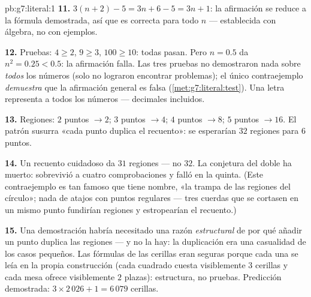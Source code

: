 \begin{solution}{pb:g7:literal:1}
\textbf{11.} $3(n + 2) - 5 = 3n + 6 - 5 = 3n + 1$: la afirmación
se reduce a la fórmula demostrada, así que es correcta para todo $n$ ---
establecida con álgebra, no con ejemplos.

\textbf{12.} Pruebas: $4 \geq 2$, $9 \geq 3$, $100 \geq 10$: todas
pasan. Pero $n = 0.5$ da $n^2 = 0.25 < 0.5$: la afirmación falla.
Las tres pruebas no demostraron nada sobre \emph{todos} los números (solo
no lograron encontrar problemas); el único contraejemplo
\emph{demuestra} que la afirmación general es falsa
(\cref{met:g7:literal:test}). Una letra representa a todos los números
--- decimales incluidos.

\textbf{13.} Regiones: $2$ puntos $\to 2$; $3$ puntos $\to 4$;
$4$ puntos $\to 8$; $5$ puntos $\to 16$. El patrón susurra
«cada punto duplica el recuento»: se esperarían $32$ regiones para
$6$ puntos.

\textbf{14.} Un recuento cuidadoso da $31$ regiones --- no $32$.
La conjetura del doble ha muerto: sobrevivió a cuatro comprobaciones y
falló en la quinta. (Este contraejemplo es tan famoso que tiene
nombre, «la trampa de las regiones del círculo»; nada de atajos con puntos regulares
--- tres cuerdas que se cortasen en un mismo punto fundirían regiones y
estropearían el recuento.)

\textbf{15.} Una demostración habría necesitado una razón \emph{estructural}
de por qué añadir un punto duplica las regiones --- y no la
hay: la duplicación era una casualidad de los casos pequeños. Las
fórmulas de las cerillas eran seguras porque cada una se leía en la
propia construcción (cada cuadrado cuesta visiblemente $3$ cerillas y
cada mesa ofrece visiblemente $2$ plazas): estructura, no pruebas.
Predicción demostrada: $3 \times 2\,026 + 1 = 6\,079$ cerillas.
\end{solution}
